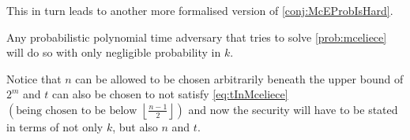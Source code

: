 This in turn leads to another more formalised version of \cref{conj:McEProbIsHard}.
\begin{conj}
\label{conj:solMcEIsNegInN}
	Any probabilistic polynomial time adversary that tries to solve \cref{prob:mceliece} will do so with only negligible probability in $k$.
\end{conj}

Notice that $n$ can be allowed to be chosen arbitrarily beneath the upper bound of $2^m$ and $t$ can also be chosen to not satisfy \cref{eq:tInMceliece} $\left(\text{being chosen to be below }\left\lfloor \frac{n - 1}{2} \right\rfloor\right)$ and now the security will have to be stated in terms of not only $k$, but also $n$ and $t$.

